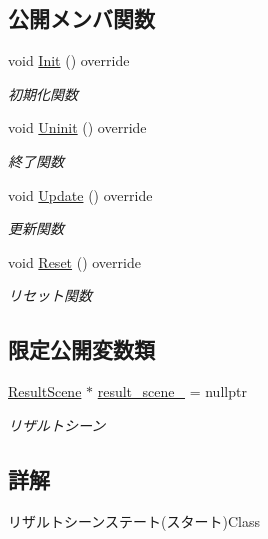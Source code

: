 \subsection*{公開メンバ関数}
\begin{DoxyCompactItemize}
\item 
void \mbox{\hyperlink{class_result_scene_state___start_a615c7e05efd2320b8956c5fd94398f55}{Init}} () override
\begin{DoxyCompactList}\small\item\em 初期化関数 \end{DoxyCompactList}\item 
void \mbox{\hyperlink{class_result_scene_state___start_af5b9af607074e3296481a1660607fb9a}{Uninit}} () override
\begin{DoxyCompactList}\small\item\em 終了関数 \end{DoxyCompactList}\item 
void \mbox{\hyperlink{class_result_scene_state___start_a2ecdef2bef0cd1a04055e8687e11199b}{Update}} () override
\begin{DoxyCompactList}\small\item\em 更新関数 \end{DoxyCompactList}\item 
void \mbox{\hyperlink{class_result_scene_state___start_a8f776a7b2d31451c434fb74ffdd65960}{Reset}} () override
\begin{DoxyCompactList}\small\item\em リセット関数 \end{DoxyCompactList}\end{DoxyCompactItemize}
\subsection*{限定公開変数類}
\begin{DoxyCompactItemize}
\item 
\mbox{\hyperlink{class_result_scene}{Result\+Scene}} $\ast$ \mbox{\hyperlink{class_result_scene_state___start_a223a52e93231e460dad3401a1a49931d}{result\+\_\+scene\+\_\+}} = nullptr
\begin{DoxyCompactList}\small\item\em リザルトシーン \end{DoxyCompactList}\end{DoxyCompactItemize}


\subsection{詳解}
リザルトシーンステート(スタート)Class 

